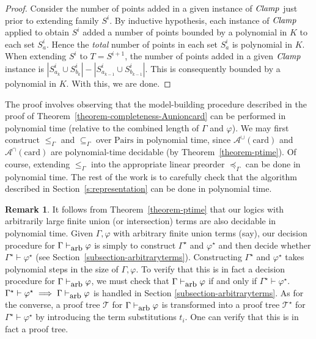 \documentclass[letterpaper]{article} %
\theoremstyle{definition}
\newtheorem{remark}[theorem]{Remark}
\newcommand{\proves}{\vdash}
\newcommand{\Aunion}{\mathscr{A}^{\cup}}
\newcommand{\Ainter}{\mathscr{A}^{\cap}}
\newcommand{\card}{\mathrm{card}}
\newcommand{\provesarbitrary}{\proves_{\mbox{\small{arb}}}}
\newcommand{\Pairs}{\mbox{Pairs}}
\newcommand{\Clamp}{\protect{\mbox{\textit{Clamp}}}}
\newcommand{\provsub}{\subseteq_{\Gamma}}
\newcommand{\provle}{\le_{\Gamma}}
\newcommand{\provextended}{\preceq_{\Gamma}}
\begin{document}
{\begin{proof}
Consider the number of points added in a given instance of $\Clamp$ just prior to extending family $S^i$.  By inductive hypothesis, each instance of $\Clamp$ applied to obtain $S^i$ added a number of points bounded by a polynomial in $K$ to each set $S^i_a$.  Hence the \textit{total} number of points in each set $S^i_a$ is polynomial in $K$.  When extending $S^i$ to $T = S^{i+1}$, the number of points added in a given $\Clamp$ instance is $|S^i_{a_k} \cup S^i_{b_k}| - |S^i_{a_{k-1}} \cup S^i_{b_{k-1}}|$.  This is consequently bounded by a polynomial in $K$.
With this, we are done.
\end{proof}
}

The proof involves observing that the model-building procedure described in the proof of Theorem~\ref{theorem-completeness-Aunioncard} can be performed in polynomial time (relative to the combined length of $\Gamma$ and $\varphi$).  We may first construct $\provle$ and $\provsub$ over $\Pairs$ in polynomial time, since $\Aunion(\card)$ and $\Ainter(\card)$ are polynomial-time decidable (by Theorem~\ref{theorem-ptime}).  Of course, extending $\provle$ into the appropriate linear preorder $\provextended$ can be done in polynomial time.  The rest of the work is to carefully check that the algorithm described in Section~\ref{s:representation} can be done in polynomial time.  %

\begin{remark}
It follows from Theorem~\ref{theorem-ptime} that our logics with arbitrarily large finite union (or intersection) terms are also decidable in polynomial time.  
Given $\Gamma, \varphi$ with arbitrary finite union terms (say), our decision procedure for $\Gamma \provesarbitrary \varphi$ is simply to construct $\Gamma^\star$ and $\varphi^\star$ and then decide whether $\Gamma^\star \proves \varphi^\star$ (see Section~\ref{subsection-arbitraryterms}).  
Constructing $\Gamma^\star$ and $\varphi^\star$ takes polynomial steps in the size of $\Gamma, \varphi$.  To verify that this is in fact a decision procedure for $\Gamma \provesarbitrary \varphi$, we must check that $\Gamma \provesarbitrary \varphi$ if and only if $\Gamma^\star \proves \varphi^\star$.  $\Gamma^\star \proves \varphi^\star \implies \Gamma \provesarbitrary \varphi$ is handled in Section \ref{subsection-arbitraryterms}.  As for the converse, a proof tree $\mathcal{T}$ for $\Gamma \provesarbitrary \varphi$ is transformed into a proof tree $\mathcal{T}^\star$ for $\Gamma^\star \proves \varphi^\star$ by introducing the term substitutions $t_i$.  One can verify that this is in fact a proof tree.  %

\label{remark-complexity}
\end{remark}
\end{document}
